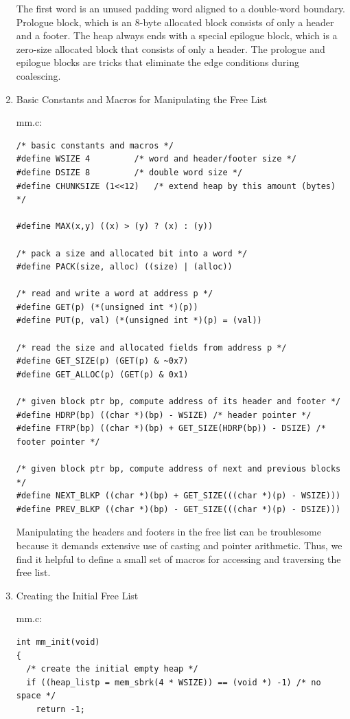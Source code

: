 \documentclass[11pt]{article}
\begin{document}
\begin{enumerate}
The first word is an unused padding word aligned to a double-word boundary. Prologue block, which is an 8-byte allocated block consists of only a header and a footer. The heap always ends with a special epilogue block, which is a zero-size allocated block that consists of only a header. The prologue and epilogue blocks are tricks that eliminate the edge conditions during coalescing.\\

\item Basic Constants and Macros for Manipulating the Free List
\label{sec:org2b7db87}

mm.c:\\
\begin{verbatim}
/* basic constants and macros */
#define WSIZE 4 		/* word and header/footer size */
#define DSIZE 8			/* double word size */
#define CHUNKSIZE (1<<12)	/* extend heap by this amount (bytes) */

#define MAX(x,y) ((x) > (y) ? (x) : (y))

/* pack a size and allocated bit into a word */
#define PACK(size, alloc) ((size) | (alloc))

/* read and write a word at address p */
#define GET(p) (*(unsigned int *)(p))
#define PUT(p, val) (*(unsigned int *)(p) = (val))

/* read the size and allocated fields from address p */
#define GET_SIZE(p) (GET(p) & ~0x7)
#define GET_ALLOC(p) (GET(p) & 0x1)

/* given block ptr bp, compute address of its header and footer */
#define HDRP(bp) ((char *)(bp) - WSIZE) /* header pointer */
#define FTRP(bp) ((char *)(bp) + GET_SIZE(HDRP(bp)) - DSIZE) /* footer pointer */

/* given block ptr bp, compute address of next and previous blocks */
#define NEXT_BLKP ((char *)(bp) + GET_SIZE(((char *)(p) - WSIZE)))
#define PREV_BLKP ((char *)(bp) - GET_SIZE(((char *)(p) - DSIZE)))

\end{verbatim}

Manipulating the headers and footers in the free list can be troublesome because it demands extensive use of casting and pointer arithmetic. Thus, we find it helpful to define a small set of macros for accessing and traversing the free list.\\

\item Creating the Initial Free List
\label{sec:org27ad507}

mm.c:\\
\begin{verbatim}
int mm_init(void)
{
  /* create the initial empty heap */
  if ((heap_listp = mem_sbrk(4 * WSIZE)) == (void *) -1) /* no space */
    return -1;


\end{verbatim}
\end{enumerate}
\end{document}
